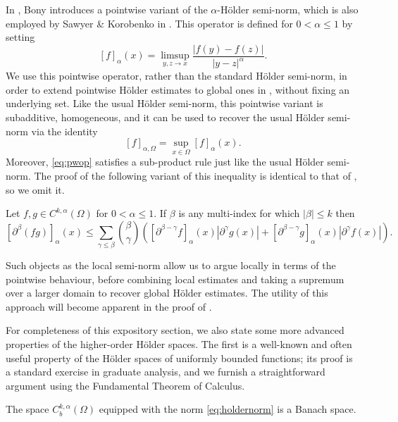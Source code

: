 \documentclass[oneside,hidelinks,indentfirst,10pt]{book}
\begin{document}
In \cite{Bony2}, Bony introduces a pointwise variant of the \(\alpha\)-H\"older semi-norm, which is also employed by Sawyer \& Korobenko in \cite{SOS_I}. This operator is defined for \(0<\alpha\leq 1\) by setting
\begin{equation}\label{eq:pwop}
    [f]_{\alpha}(x)=\limsup_{y,z\rightarrow x}\frac{|f(y)-f(z)|}{|y-z|^\alpha}.
\end{equation}
We use this pointwise operator, rather than the standard H\"older semi-norm, in order to extend pointwise H\"older estimates to global ones in , without fixing an underlying set. Like the usual H\"older semi-norm, this pointwise variant is subadditive, homogeneous, and it can be used to recover the usual H\"older semi-norm via the identity 
\[
    [f]_{\alpha,\Omega}=\sup_{x\in\Omega}[f]_{\alpha}(x).
\]
Moreover, \eqref{eq:pwop} satisfies a sub-product rule just like the usual H\"older semi-norm. The proof of the following variant of this inequality is identical to that of , so we omit it.


\begin{lem}\label{lem:sharpsubprod}
Let \(f,g\in C^{k,\alpha}(\Omega)\) for \(0<\alpha\leq 1\). If \(\beta\) is any multi-index for which \(|\beta|\leq k\) then
\[
    [\partial^\beta(fg)]_{\alpha}(x)\leq\sum_{\gamma\leq\beta}\binom{\beta}{\gamma}([\partial^{\beta-\gamma}f]_{\alpha}(x)|\partial^\gamma g(x)|+[\partial^{\beta-\gamma}g]_{\alpha}(x)|\partial^\gamma f(x)|).
\]
\end{lem}


Such objects as the local semi-norm allow us to argue locally in terms of the pointwise behaviour, before combining local estimates and taking a supremum over a larger domain to recover global H\"older estimates. The utility of this approach will become apparent in the proof of . 


For completeness of this expository section, we also state some more advanced properties of the higher-order H\"older spaces. The first is a well-known and often useful property of the H\"older spaces of uniformly bounded functions; its proof is a standard exercise in graduate analysis, and we furnish a straightforward argument using the Fundamental Theorem of Calculus.


\begin{thm}
The space \(C_b^{k,\alpha}(\Omega)\) equipped with the norm \eqref{eq:holdernorm} is a Banach space.
\end{thm}
\end{document}
